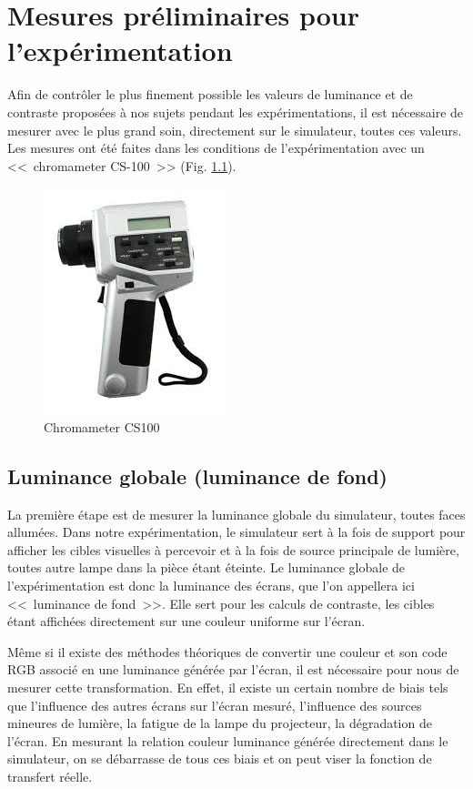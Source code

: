 \chapter{Mesures préliminaires pour l'expérimentation}
\par Afin de contrôler le plus finement possible les valeurs de luminance et de contraste proposées à nos sujets pendant les expérimentations, il est nécessaire de mesurer avec le plus grand soin, directement sur le simulateur, toutes ces valeurs. Les mesures ont été faites dans les conditions de l'expérimentation avec un <<~chromameter CS-100~>> (Fig. \ref{fig:chromameter_cs100}).

\begin{figure}[h]
	\centering
	\includegraphics[scale=1]{Figures/ChromameterCS100}
	\caption{Chromameter CS100}
	\label{fig:chromameter_cs100}
\end{figure}
	
	\section{Luminance globale (luminance de fond)}
	\par La première étape est de mesurer la luminance globale du simulateur, toutes faces allumées. Dans notre expérimentation, le simulateur sert à la fois de support pour afficher les cibles visuelles à percevoir et à la fois de source principale de lumière, toutes autre lampe dans la pièce étant éteinte. Le luminance globale de l'expérimentation est donc la luminance des écrans, que l'on appellera ici <<~luminance de fond~>>. Elle sert pour les calculs de contraste, les cibles étant affichées directement sur une couleur uniforme sur l'écran.
	
	\par Même si il existe des méthodes théoriques de convertir une couleur et son code RGB associé en une luminance générée par l'écran, il est nécessaire pour nous de mesurer cette transformation. En effet, il existe un certain nombre de biais tels que l'influence des autres écrans sur l'écran mesuré, l'influence des sources mineures de lumière, la fatigue de la lampe du projecteur, la dégradation de l'écran. En mesurant la relation couleur luminance générée directement dans le simulateur, on se débarrasse de tous ces biais et on peut viser la fonction de transfert réelle.
	

